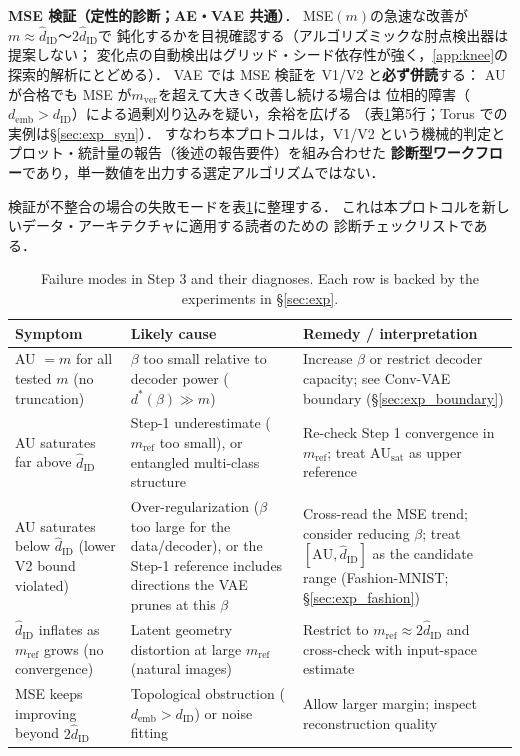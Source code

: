 \documentclass[11pt,a4paper]{jsarticle}
\newcommand{\dID}{d_{\mathrm{ID}}}
\newcommand{\hatdID}{\hat{d}_{\mathrm{ID}}}
\newcommand{\AUsat}{\mathrm{AU}_{\mathrm{sat}}}
\newcommand{\demb}{d_{\mathrm{emb}}}
\newcommand{\dstar}{d^{*}(\beta)}
\begin{document}
\textbf{MSE 検証（定性的診断；AE・VAE 共通）}．
MSE$(m)$の急速な改善が$m \approx \hatdID$〜$2\hatdID$で
鈍化するかを目視確認する（アルゴリズミックな肘点検出器は提案しない；
変化点の自動検出はグリッド・シード依存性が強く，\ref{app:knee}の
探索的解析にとどめる）．
VAE では MSE 検証を V1/V2 と\textbf{必ず併読}する：
AU が合格でも MSE が$m_{\mathrm{ver}}$を超えて大きく改善し続ける場合は
位相的障害（$\demb > \dID$）による過剰刈り込みを疑い，余裕を広げる
（表\ref{tab:failure}第5行；Torus での実例は§\ref{sec:exp_syn}）．
すなわち本プロトコルは，V1/V2 という機械的判定と
プロット・統計量の報告（後述の報告要件）を組み合わせた
\textbf{診断型ワークフロー}であり，単一数値を出力する選定アルゴリズムではない．

検証が不整合の場合の失敗モードを表\ref{tab:failure}に整理する．
これは本プロトコルを新しいデータ・アーキテクチャに適用する読者のための
診断チェックリストである．

\begin{table}[H]
\centering
\caption{Failure modes in Step 3 and their diagnoses. Each row is backed by
the experiments in §\ref{sec:exp}.}
\label{tab:failure}
\small
\begin{tabular}{p{4.2cm}p{4.6cm}p{4.6cm}}
\toprule
Symptom & Likely cause & Remedy / interpretation \\
\midrule
AU $= m$ for all tested $m$ (no truncation) & $\beta$ too small relative to decoder power ($\dstar \gg m$) & Increase $\beta$ or restrict decoder capacity; see Conv-VAE boundary (§\ref{sec:exp_boundary}) \\
AU saturates far above $\hatdID$ & Step-1 underestimate ($m_{\mathrm{ref}}$ too small), or entangled multi-class structure & Re-check Step 1 convergence in $m_{\mathrm{ref}}$; treat $\AUsat$ as upper reference \\
AU saturates below $\hatdID$ (lower V2 bound violated) & Over-regularization ($\beta$ too large for the data/decoder), or the Step-1 reference includes directions the VAE prunes at this $\beta$ & Cross-read the MSE trend; consider reducing $\beta$; treat $[\mathrm{AU}, \hatdID]$ as the candidate range (Fashion-MNIST; §\ref{sec:exp_fashion}) \\
$\hatdID$ inflates as $m_{\mathrm{ref}}$ grows (no convergence) & Latent geometry distortion at large $m_{\mathrm{ref}}$ (natural images) & Restrict to $m_{\mathrm{ref}} \approx 2\hatdID$ and cross-check with input-space estimate \\
MSE keeps improving beyond $2\hatdID$ & Topological obstruction ($\demb > \dID$) or noise fitting & Allow larger margin; inspect reconstruction quality \\
\bottomrule
\end{tabular}
\end{table}
\end{document}
